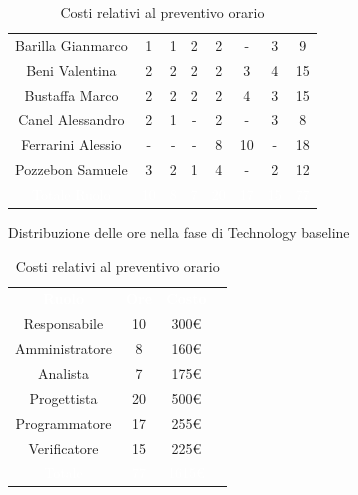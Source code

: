 \begin{table}[h!]
\begin{minipage}[c]{0.53\textwidth}
\begin{tabular}{>{\raggedright\arraybackslash}c|cccccc|c}
		\rowcolor[RGB]{216, 235, 171}
	    	Barilla Gianmarco & 1 & 1 & 2 & 2 & - & 3& 9		\\[4pt]
	    \rowcolor[RGB]{233, 245, 206}
	    	Beni Valentina & 2 & 2 & 2 & 2 & 3 & 4& 15			\\[4pt]
	    \rowcolor[RGB]{216, 235, 171}
	    	Bustaffa Marco & 2 & 2 & 2 & 2 & 4 & 3& 15			\\[4pt]
        \rowcolor[RGB]{233, 245, 206}
	    	Canel Alessandro & 2 & 1 & - & 2 & - & 3& 8			\\[4pt]
        \rowcolor[RGB]{216, 235, 171}
	    	Ferrarini Alessio & - & - & - & 8 & 10 & -& 18		\\[4pt]
        \rowcolor[RGB]{233, 245, 206}
	    	Pozzebon Samuele & 3 & 2 & 1 & 4 & - & 2& 12			\\[4pt]
		\rowcolor[RGB]{47, 106, 73}
			\textcolor{white}{Totale Ruolo} & \textcolor{white}{10} & \textcolor{white}{8} & \textcolor{white}{7} 
			& \textcolor{white}{20} & \textcolor{white}{17} & \textcolor{white}{15}
			& \textcolor{white}{77} \\[4pt]	
    \end{tabular}
    \caption{Distribuzione delle ore nella fase di Technology baseline}
\end{minipage}
\hfill
\begin{minipage}{0.33\textwidth}
	\centering
	\begin{tabular}{cccc}
	    \rowcolor[RGB]{33, 73, 50}
	    \textcolor{white}{\textbf{Ruolo}} & \textcolor{white}{\textbf{Ore}} & \textcolor{white}{\textbf{Costo}}\\[4pt]
	    \rowcolor[RGB]{216, 235, 171}
	    Responsabile & 10 & 300\euro\\[4pt]
	    \rowcolor[RGB]{233, 245, 206}
	    Amministratore & 8 & 160\euro\\[4pt]
        \rowcolor[RGB]{216, 235, 171}
	    Analista & 7 & 175\euro\\[4pt]
	    \rowcolor[RGB]{233, 245, 206}
	    Progettista & 20 & 500\euro\\[4pt]
        \rowcolor[RGB]{216, 235, 171}
	    Programmatore & 17 & 255\euro\\[4pt]
	    \rowcolor[RGB]{233, 245, 206}
	    Verificatore & 15 & 225\euro\\[4pt]
		\rowcolor[RGB]{47, 106, 73}
			\textcolor{white}{Totale} & \textcolor{white}{77} & \textcolor{white}{1615\euro}\\[4pt]	
    \end{tabular}	
	\caption{Costi relativi al preventivo orario}

\end{minipage}
\end{table}

